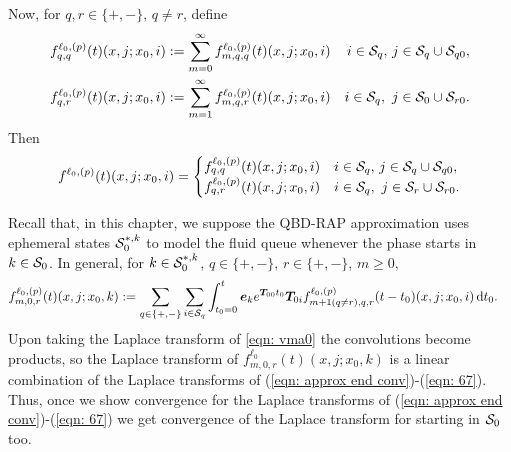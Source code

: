 Now, for \(q,r\in\{+,-\},\, q\neq r\), define  
\begin{align*}
	f^{\ell_0,(p)}_{q,q}(t)(x,j;x_0,i)  &:= \sum_{m=0}^\infty f^{\ell_0,(p)}_{m,q,q}(t)(x,j;x_0,i)  & i\in\mathcal{S}_q,\,j\in\mathcal{S}_q\cup\mathcal{S}_{q0},
	\\ f^{\ell_0,(p)}_{q,r}(t)(x,j;x_0,i)  &:= \sum_{m=1}^\infty f^{\ell_0,(p)}_{m,q,r}(t)(x,j;x_0,i)  & i\in\mathcal S_q,\,\,j\in\mathcal S_{0}\cup\mathcal{S}_{r0}.
\end{align*}
Then 
\begin{align}
	f^{\ell_0,(p)}(t)(x,j;x_0,i)  = \begin{cases}
		 f^{\ell_0,(p)}_{q,q}(t)(x,j;x_0,i)  & i\in\mathcal{S}_q,\,j\in\mathcal{S}_q\cup\mathcal{S}_{q0},
	\\    f^{\ell_0,(p)}_{q,r}(t)(x,j;x_0,i)  & i\in\mathcal S_q,\,\,j\in\mathcal S_{r}\cup\mathcal{S}_{r0}.
	\end{cases}\label{eqn:ghghghghggg}
\end{align}

Recall that, in this chapter, we suppose the QBD-RAP approximation uses ephemeral states \(\mathcal{S}_0^{*,k}\) to model the fluid queue whenever the phase starts in \(k\in\mathcal{S}_0\). In general, for \(k\in\mathcal{S}_0^{*,k}\), \(q\in \{+,-\}, \, r\in\{+,-\}\), \(m\geq 0\),
\begin{align}
	f_{m,0,r}^{\ell_0,(p)}(t)(x,j;x_0,k)  
	&:= \sum_{q\in\{+,-\}}\sum_{i\in\mathcal{S}_q}\int_{t_0=0}^t \boldsymbol e_ke^{\boldsymbol T_{00}t_0} \boldsymbol T_{0i} f_{m+1(q\neq r),q,r}^{\ell_0,(p)}(t-t_0)(x,j;x_0,i)\, \mathrm{d} t_0 . \label{eqn: vma0}
\end{align}
Upon taking the Laplace transform of \ref{eqn: vma0} the convolutions become products, so the Laplace transform of \(f_{m,0,r}^{\ell_0}(t)(x,j;x_0,k)\) is a linear combination of the Laplace transforms of (\ref{eqn: approx end conv})-(\ref{eqn: 67}). Thus, once we show convergence for the Laplace transforms of (\ref{eqn: approx end conv})-(\ref{eqn: 67}) we get convergence of the Laplace transform for starting in \(\mathcal{S}_0\) too. 


